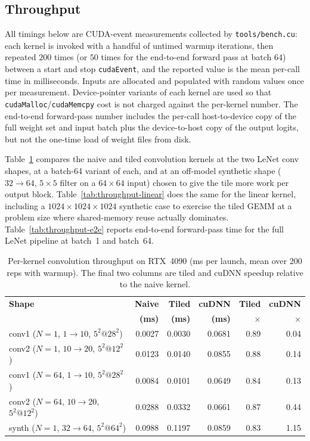\documentclass[conference]{IEEEtran}
\begin{document}
\subsection{Throughput}
\label{sec:throughput}
All timings below are CUDA-event measurements collected by
\texttt{tools/bench.cu}: each kernel is invoked with a handful of
untimed warmup iterations, then repeated $200$ times (or $50$ times
for the end-to-end forward pass at batch $64$) between a start and
stop \texttt{cudaEvent}, and the reported value is the mean per-call
time in milliseconds. Inputs are allocated and populated with random
values once per measurement. Device-pointer variants of each kernel
are used so that \texttt{cudaMalloc}/\texttt{cudaMemcpy} cost is not
charged against the per-kernel number. The end-to-end forward-pass
number includes the per-call host-to-device copy of the full weight
set and input batch plus the device-to-host copy of the output
logits, but not the one-time load of weight files from disk.

Table~\ref{tab:throughput-conv} compares the naive and tiled
convolution kernels at the two LeNet conv shapes, at a
batch-64 variant of each, and at an off-model synthetic shape
($32{\to}64$, $5{\times}5$ filter on a $64{\times}64$ input) chosen
to give the tile more work per output block.
Table~\ref{tab:throughput-linear} does the same for the linear
kernel, including a $1024\times1024\times1024$ synthetic case to
exercise the tiled GEMM at a problem size where shared-memory reuse
actually dominates. Table~\ref{tab:throughput-e2e} reports end-to-end
forward-pass time for the full LeNet pipeline at batch~1 and
batch~64.

\begin{table}[htbp]
\caption{Per-kernel convolution throughput on RTX~4090 (ms per launch,
mean over 200 reps with warmup). The final two columns are tiled and
cuDNN speedup relative to the naive kernel.}
\label{tab:throughput-conv}
\begin{center}
\scriptsize
\setlength{\tabcolsep}{3pt}
\begin{tabular}{@{}lrrrrr@{}}
\toprule
\textbf{Shape} & \textbf{Naive} & \textbf{Tiled} & \textbf{cuDNN} &
\textbf{Tiled} & \textbf{cuDNN} \\
               & \textbf{(ms)}  & \textbf{(ms)}  & \textbf{(ms)}  &
\textbf{$\times$} & \textbf{$\times$} \\
\midrule
conv1 ($N{=}1$, $1{\to}10$, $5^2@28^2$)     & 0.0027 & 0.0030 & 0.0681 & 0.89 & 0.04 \\
conv2 ($N{=}1$, $10{\to}20$, $5^2@12^2$)    & 0.0123 & 0.0140 & 0.0855 & 0.88 & 0.14 \\
conv1 ($N{=}64$, $1{\to}10$, $5^2@28^2$)    & 0.0084 & 0.0101 & 0.0649 & 0.84 & 0.13 \\
conv2 ($N{=}64$, $10{\to}20$, $5^2@12^2$)   & 0.0288 & 0.0332 & 0.0661 & 0.87 & 0.44 \\
synth ($N{=}1$, $32{\to}64$, $5^2@64^2$)    & 0.0988 & 0.1197 & 0.0859 & 0.83 & 1.15 \\
\bottomrule
\end{tabular}
\end{center}
\end{table}
\end{document}
